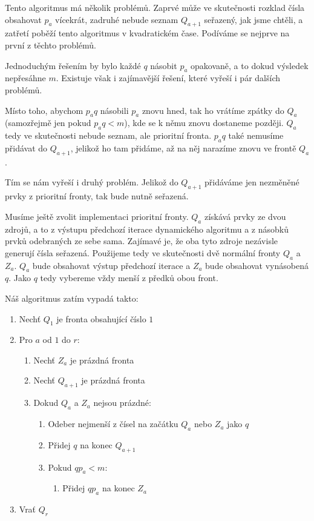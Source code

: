 \documentclass{article}
\begin{document}
Tento algoritmus má několik problémů. Zaprvé může ve skutečnosti rozklad čísla obsahovat $p_a$ vícekrát, zadruhé nebude seznam $Q_{a+1}$ seřazený, jak jsme chtěli, a zatřetí poběží tento algoritmus v kvadratickém čase. Podíváme se nejprve na první z těchto problémů.

Jednoduchým řešením by bylo každé $q$ násobit $p_a$ opakovaně, a to dokud výsledek nepřesáhne $m$. Existuje však i zajímavější řešení, které vyřeší i pár dalších problémů.

Místo toho, abychom $p_a q$ násobili $p_a$ znovu hned, tak ho vrátíme zpátky do $Q_a$ (samozřejmě jen pokud $p_a q < m$), kde se k němu znovu dostaneme později. $Q_a$ tedy ve skutečnosti nebude seznam, ale prioritní fronta. $p_a q$ také nemusíme přidávat do $Q_{a+1}$, jelikož ho tam přidáme, až na něj narazíme znovu ve frontě $Q_a$.

Tím se nám vyřeší i druhý problém. Jelikož do $Q_{a+1}$ přidáváme jen nezměněné prvky z prioritní fronty, tak bude nutně seřazená.

Musíme ještě zvolit implementaci prioritní fronty. $Q_a$ získává prvky ze dvou zdrojů, a to z výstupu předchozí iterace dynamického algoritmu a z násobků prvků odebraných ze sebe sama. Zajímavé je, že oba tyto zdroje nezávisle generují čísla seřazená. Použijeme tedy ve skutečnosti dvě normální fronty $Q_a$ a $Z_a$. $Q_a$ bude obsahovat výstup předchozí iterace a $Z_a$ bude obsahovat vynásobená $q$. Jako $q$ tedy vybereme vždy menší z předků obou front.

Náš algoritmus zatím vypadá takto:

\begin{enumerate}
    \item Nechť $Q_1$ je fronta obsahující číslo $1$
    \item Pro $a$ od $1$ do $r$:
          \begin{enumerate}[label*=\arabic*.]
              \item Nechť $Z_a$ je prázdná fronta
              \item Nechť $Q_{a+1}$ je prázdná fronta
              \item Dokud $Q_a$ a $Z_a$ nejsou prázdné:
                    \begin{enumerate}[label*=\arabic*.]
                        \item Odeber nejmenší z čísel na začátku $Q_a$ nebo $Z_a$ jako $q$
                        \item Přidej $q$ na konec $Q_{a+1}$
                        \item Pokud $q p_a < m$:
                              \begin{enumerate}[label*=\arabic*.]
                                  \item Přidej $q p_a$ na konec $Z_{a}$
                              \end{enumerate}
                    \end{enumerate}
          \end{enumerate}
    \item Vrať $Q_r$
\end{enumerate}
\end{document}
